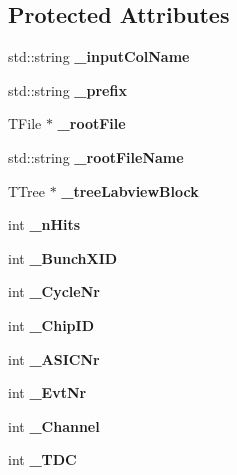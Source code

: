 \subsection*{Protected Attributes}
\begin{DoxyCompactItemize}
\item 
std::string {\bfseries \_\-inputColName}\label{classCALICE_1_1RootTreeGenerator_a45697ed70cf6e099a2020dd714504e97}

\item 
std::string {\bfseries \_\-prefix}\label{classCALICE_1_1RootTreeGenerator_a40fa892791255b3cf185ae01fc1df8a8}

\item 
TFile $\ast$ {\bfseries \_\-rootFile}\label{classCALICE_1_1RootTreeGenerator_aedbcdb07e45e1b40d7cd8212cba0629f}

\item 
std::string {\bfseries \_\-rootFileName}\label{classCALICE_1_1RootTreeGenerator_ac0f4cfe564f803f8c1c3ced97d8ce0d1}

\item 
TTree $\ast$ {\bfseries \_\-treeLabviewBlock}\label{classCALICE_1_1RootTreeGenerator_a9a706fe7be21b16d3a4a8fd1f58ced1f}

\item 
int {\bfseries \_\-nHits}\label{classCALICE_1_1RootTreeGenerator_afeb6f7f6fa7f8f90f98556dab8e4843e}

\item 
int {\bfseries \_\-BunchXID}\label{classCALICE_1_1RootTreeGenerator_a263bd06e050d66020d71346b7fe17f94}

\item 
int {\bfseries \_\-CycleNr}\label{classCALICE_1_1RootTreeGenerator_a7a11796d640791a6015a9ef546c828cb}

\item 
int {\bfseries \_\-ChipID}\label{classCALICE_1_1RootTreeGenerator_acff8c71e037b9886df76290fd718a2fc}

\item 
int {\bfseries \_\-ASICNr}\label{classCALICE_1_1RootTreeGenerator_a2fa8cff4b18af909633f82a4abb417f3}

\item 
int {\bfseries \_\-EvtNr}\label{classCALICE_1_1RootTreeGenerator_a5ecdacceba84880bda93af94d9ed8e64}

\item 
int {\bfseries \_\-Channel}\label{classCALICE_1_1RootTreeGenerator_ac5c4be539f3cca086c6e84861b7dc1fc}

\item 
int {\bfseries \_\-TDC}\label{classCALICE_1_1RootTreeGenerator_afe617610463d32361b66694ee8b0eb81}


\end{DoxyCompactItemize}
